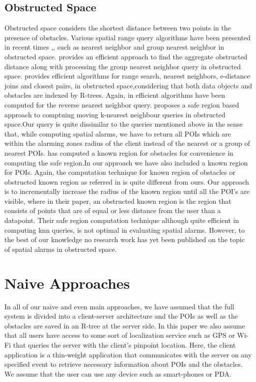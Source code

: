 \documentclass{sig-alternate}
\begin{document}
\subsection{Obstructed Space} 
Obstructed space considers the shortest distance between two points in the presence of obstacles.\cite{deberg} Various spatial range query algorithms have been presented in recent times \cite{obst1},\cite{obst2},\cite{ognn} such as nearest neighbor and group nearest neighbor in obstructed space.\cite{ognn} provides an efficient approach to find the aggregate obstructed distance along with processing the group nearest neighbor query in obstructed space.\cite{obst1} provides efficient algorithms for range search, nearest neighbors, e-distance joins and closest pairs, in obstructed space,considering that both data objects and obstacles are indexed by R-trees. Again, in \cite{obst2} efficient algorithms have been computed for the reverse nearest neighbor query. \cite{mknn} proposes a safe region based approach to comptuing moving k-nearest neighbour queries in obstructed space.Our query is quite dissimilar to the queries mentioned above in the sense that, while computing spatial alarms, we have to return all POIs which are within the alarming zones radius of the client instead of the nearest or a group of nearest POIs. \cite{mknn} has computed a known region for obstacles for convenience in computing the safe region.In our approach we have also included a known region for POIs. Again, the computation technique for known region of obstacles or obstructed known region as referred in \cite{mknn} is quite different from ours. Our approach is to incrementally increase the radius of the known region until all the POI's are visible, where in their paper, an obstructed known region is the region that consists of points that are of equal or less distance from the user than a datapoint. Their safe region computation technique although quite efficient in computing knn queries, is not optimal in evaluating spatial alarms. However, to the best of our knowledge no research work has yet been published on the topic of spatial alarms in obstructed space.\\


\section{Naive Approaches}
In all of our naive and even main approaches, we have assumed that the full system is divided into a client-server architecture and the POIs as well as the obstacles are saved in an R-tree at the server side. In this paper we also assume that all users have access to some sort of localization service such as GPS or Wi-Fi that queries the server with the client's pinpoint location. Here, the client application is a thin-weight application that communicates with the server on any specified event to retrieve necessary information about POIs and the obstacles. We assume that the user can use any device such as smart-phones or PDA.\\
\end{document}
